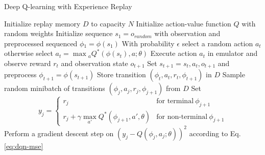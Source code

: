 \begin{algorithm}
\caption{Deep Q-learning with Experience Replay}\label{alg:dqn}
\begin{algorithmic}[1]
\State Initialize replay memory $D$ to capacity $N$
\State Initialize action-value function $Q$ with random weights
    \State Initialize sequence $s_1={o_{random}}$ with observation and preprocessed sequenced $\phi{}_1=\phi{(s_1)}$
        \State With probability $\epsilon$ select a random action $a_t$
        \State otherwise select $a_t=\max{}_aQ^{*}(\phi{(s_t)}, a; \theta)$
        \State Execute action $a_t$ in emulator and observe reward $r_t$ and observation state $o_{t+1}$
        \State Set $s_{t+1}=s_t,a_t,o_{t+1}$ and preprocess $\phi_{t+1}=\phi{(s_{t+1})}$
        \State Store transition $(\phi_t,a_t,r_t,\phi_{t+1})$ in $D$
        \State Sample random minibatch of transitions $(\phi_j,a_j,r_j,\phi_{j+1})$ from $D$
        \State Set
            \[
                y_j = \begin{cases}
                    r_j & \textrm{for terminal}\ \phi_{j+1}\\
                    r_j+\gamma \max_{a'} Q^*(\phi_{j+1},a', \theta) & \textrm{for non-terminal}\ \phi_{j+1}
                \end{cases}
            \]
        \State Perform a gradient descent step on $(y_j-Q(\phi_j,a_j;\theta))^2$ according to Eq. \ref{eq:dqn-mse}
    \EndFor
\EndFor
\end{algorithmic}
\end{algorithm}
